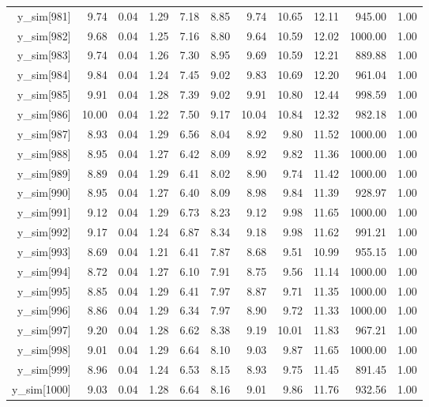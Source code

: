 \begin{table}[ht]
\begin{tabular}{rrrrrrrrrrr}
  y\_sim[981] & 9.74 & 0.04 & 1.29 & 7.18 & 8.85 & 9.74 & 10.65 & 12.11 & 945.00 & 1.00 \\ 
  y\_sim[982] & 9.68 & 0.04 & 1.25 & 7.16 & 8.80 & 9.64 & 10.59 & 12.02 & 1000.00 & 1.00 \\ 
  y\_sim[983] & 9.74 & 0.04 & 1.26 & 7.30 & 8.95 & 9.69 & 10.59 & 12.21 & 889.88 & 1.00 \\ 
  y\_sim[984] & 9.84 & 0.04 & 1.24 & 7.45 & 9.02 & 9.83 & 10.69 & 12.20 & 961.04 & 1.00 \\ 
  y\_sim[985] & 9.91 & 0.04 & 1.28 & 7.39 & 9.02 & 9.91 & 10.80 & 12.44 & 998.59 & 1.00 \\ 
  y\_sim[986] & 10.00 & 0.04 & 1.22 & 7.50 & 9.17 & 10.04 & 10.84 & 12.32 & 982.18 & 1.00 \\ 
  y\_sim[987] & 8.93 & 0.04 & 1.29 & 6.56 & 8.04 & 8.92 & 9.80 & 11.52 & 1000.00 & 1.00 \\ 
  y\_sim[988] & 8.95 & 0.04 & 1.27 & 6.42 & 8.09 & 8.92 & 9.82 & 11.36 & 1000.00 & 1.00 \\ 
  y\_sim[989] & 8.89 & 0.04 & 1.29 & 6.41 & 8.02 & 8.90 & 9.74 & 11.42 & 1000.00 & 1.00 \\ 
  y\_sim[990] & 8.95 & 0.04 & 1.27 & 6.40 & 8.09 & 8.98 & 9.84 & 11.39 & 928.97 & 1.00 \\ 
  y\_sim[991] & 9.12 & 0.04 & 1.29 & 6.73 & 8.23 & 9.12 & 9.98 & 11.65 & 1000.00 & 1.00 \\ 
  y\_sim[992] & 9.17 & 0.04 & 1.24 & 6.87 & 8.34 & 9.18 & 9.98 & 11.62 & 991.21 & 1.00 \\ 
  y\_sim[993] & 8.69 & 0.04 & 1.21 & 6.41 & 7.87 & 8.68 & 9.51 & 10.99 & 955.15 & 1.00 \\ 
  y\_sim[994] & 8.72 & 0.04 & 1.27 & 6.10 & 7.91 & 8.75 & 9.56 & 11.14 & 1000.00 & 1.00 \\ 
  y\_sim[995] & 8.85 & 0.04 & 1.29 & 6.41 & 7.97 & 8.87 & 9.71 & 11.35 & 1000.00 & 1.00 \\ 
  y\_sim[996] & 8.86 & 0.04 & 1.29 & 6.34 & 7.97 & 8.90 & 9.72 & 11.33 & 1000.00 & 1.00 \\ 
  y\_sim[997] & 9.20 & 0.04 & 1.28 & 6.62 & 8.38 & 9.19 & 10.01 & 11.83 & 967.21 & 1.00 \\ 
  y\_sim[998] & 9.01 & 0.04 & 1.29 & 6.64 & 8.10 & 9.03 & 9.87 & 11.65 & 1000.00 & 1.00 \\ 
  y\_sim[999] & 8.96 & 0.04 & 1.24 & 6.53 & 8.15 & 8.93 & 9.75 & 11.45 & 891.45 & 1.00 \\ 
  y\_sim[1000] & 9.03 & 0.04 & 1.28 & 6.64 & 8.16 & 9.01 & 9.86 & 11.76 & 932.56 & 1.00 \\ 

\end{tabular}
\end{table}
